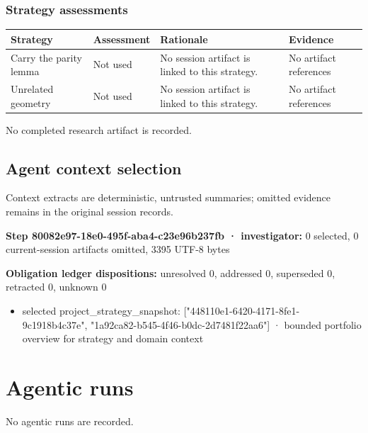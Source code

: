 \documentclass[11pt]{article}
\begin{document}
\subsubsection*{Strategy assessments}
\begin{longtable}{>{\raggedright\arraybackslash}p{.16\linewidth}>{\raggedright\arraybackslash}p{.15\linewidth}>{\raggedright\arraybackslash}p{.40\linewidth}>{\raggedright\arraybackslash}p{.17\linewidth}}
\toprule Strategy & Assessment & Rationale & Evidence \\
\midrule\endhead
Carry the parity lemma & Not used & No session artifact is linked to this strategy. & No artifact references \\
Unrelated geometry & Not used & No session artifact is linked to this strategy. & No artifact references \\
\bottomrule
\end{longtable}
No completed research artifact is recorded.\par
\subsection{Agent context selection}
Context extracts are deterministic, untrusted summaries; omitted evidence remains in the original session records.\par
\textbf{Step 80082e97-18e0-495f-aba4-c23e96b237fb · investigator:} 0 selected, 0 current-session artifacts omitted, 3395 UTF-8 bytes\par
\textbf{Obligation ledger dispositions:} unresolved 0, addressed 0, superseded 0, retracted 0, unknown 0\par
\begin{itemize}
\item selected project\_strategy\_snapshot: ["448110e1-6420-4171-8fe1-9c1918b4c37e", "1a92ca82-b545-4f46-b0dc-2d7481f22aa6"] · bounded portfolio overview for strategy and domain context
\end{itemize}
\section{Agentic runs}
No agentic runs are recorded.\par
\end{document}
